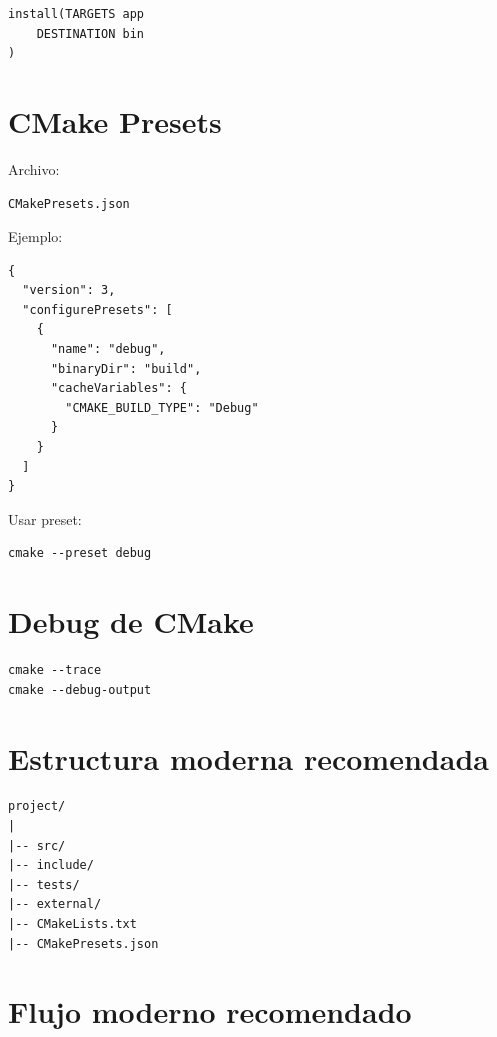 \documentclass[a4paper,11pt]{article}
\begin{document}
\begin{lstlisting}
install(TARGETS app
    DESTINATION bin
)
\end{lstlisting}


\section*{CMake Presets}

Archivo:
\begin{lstlisting}
CMakePresets.json
\end{lstlisting}

Ejemplo:
\begin{lstlisting}
{
  "version": 3,
  "configurePresets": [
    {
      "name": "debug",
      "binaryDir": "build",
      "cacheVariables": {
        "CMAKE_BUILD_TYPE": "Debug"
      }
    }
  ]
}
\end{lstlisting}

Usar preset:
\begin{lstlisting}
cmake --preset debug
\end{lstlisting}


\section*{Debug de CMake}

\begin{lstlisting}
cmake --trace
cmake --debug-output
\end{lstlisting}


\section*{Estructura moderna recomendada}

\begin{lstlisting}
project/
|
|-- src/
|-- include/
|-- tests/
|-- external/
|-- CMakeLists.txt
|-- CMakePresets.json
\end{lstlisting}


\section*{Flujo moderno recomendado}
\end{document}
